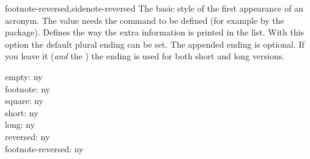 \documentclass{acro-manual}
\begin{document}
\begin{options}
{    footnote-reversed,sidenote-reversed}
    The basic style of the first appearance of an acronym.  The value
     needs the command  to be defined (for
    example by the  package).
    Defines the way the extra information is printed in the list.
    With this option the default plural ending can be
    set.  The appended  ending is optional.  If you leave it
    (\emph{and} the \code{/}) the  ending is used for both short
    and long versions.
\end{options}
 
\begin{example}
  empty: \acf{ny} \\
  footnote: \acf{ny} \\
  square: \acf{ny} \\
  short: \acf{ny} \\
  long: \acf{ny} \\
  reversed: \acf{ny} \\
  footnote-reversed: \acf{ny}
\end{example}
\end{document}
